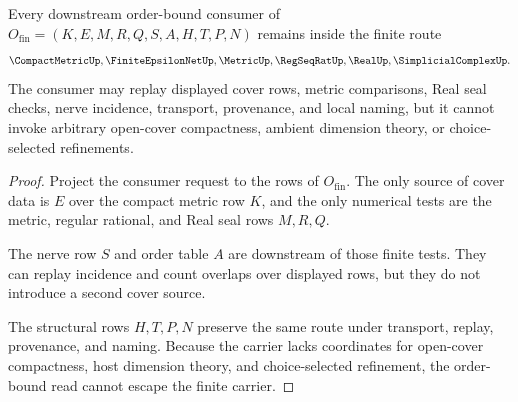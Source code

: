 
\begin{theorem}
\label{thm:coveringdimension-finite-cover-order-nonescape}
Every downstream order-bound consumer of $O_{\mathrm{fin}}=(K,E,M,R,Q,S,A,H,T,P,N)$ remains inside the finite route
$$
\CompactMetricUp,\FiniteEpsilonNetUp,\MetricUp,\RegSeqRatUp,\RealUp,\SimplicialComplexUp.
$$
The consumer may replay displayed cover rows, metric comparisons, Real seal checks, nerve incidence, transport, provenance, and local naming, but it cannot invoke arbitrary open-cover compactness, ambient dimension theory, or choice-selected refinements.
\end{theorem}
\begin{proof}
Project the consumer request to the rows of $O_{\mathrm{fin}}$. The only source of cover data is $E$ over the compact metric row $K$, and the only numerical tests are the metric, regular rational, and Real seal rows $M,R,Q$.

The nerve row $S$ and order table $A$ are downstream of those finite tests. They can replay incidence and count overlaps over displayed rows, but they do not introduce a second cover source.

The structural rows $H,T,P,N$ preserve the same route under transport, replay, provenance, and naming. Because the carrier lacks coordinates for open-cover compactness, host dimension theory, and choice-selected refinement, the order-bound read cannot escape the finite carrier.
\end{proof}

